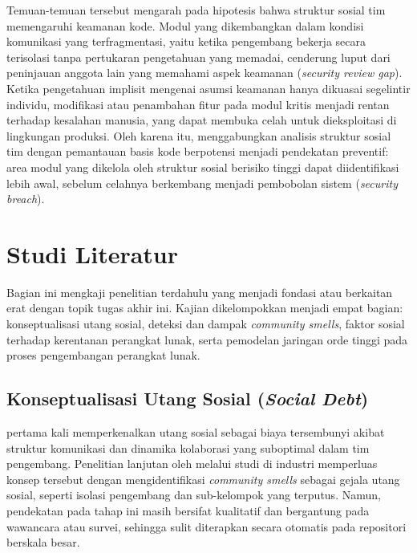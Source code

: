 Temuan-temuan tersebut mengarah pada hipotesis bahwa struktur sosial tim memengaruhi keamanan kode.
Modul yang dikembangkan dalam kondisi komunikasi yang terfragmentasi, yaitu ketika pengembang bekerja secara terisolasi tanpa pertukaran pengetahuan yang memadai, cenderung luput dari peninjauan anggota lain yang memahami aspek keamanan (\textit{security review gap}).
Ketika pengetahuan implisit mengenai asumsi keamanan hanya dikuasai segelintir individu, modifikasi atau penambahan fitur pada modul kritis menjadi rentan terhadap kesalahan manusia, yang dapat membuka celah untuk dieksploitasi di lingkungan produksi.
Oleh karena itu, menggabungkan analisis struktur sosial tim dengan pemantauan basis kode berpotensi menjadi pendekatan preventif: area modul yang dikelola oleh struktur sosial berisiko tinggi dapat diidentifikasi lebih awal, sebelum celahnya berkembang menjadi pembobolan sistem (\textit{security breach}).

\section{Studi Literatur}
Bagian ini mengkaji penelitian terdahulu yang menjadi fondasi atau berkaitan erat dengan topik tugas akhir ini.
Kajian dikelompokkan menjadi empat bagian: konseptualisasi utang sosial, deteksi dan dampak \textit{community smells}, faktor sosial terhadap kerentanan perangkat lunak, serta pemodelan jaringan orde tinggi pada proses pengembangan perangkat lunak.

\subsection{Konseptualisasi Utang Sosial (\textit{Social Debt})}
\textcite{tamburri2013social} pertama kali memperkenalkan utang sosial sebagai biaya tersembunyi akibat struktur komunikasi dan dinamika kolaborasi yang suboptimal dalam tim pengembang.
Penelitian lanjutan oleh \textcite{tamburri2015} melalui studi di industri memperluas konsep tersebut dengan mengidentifikasi \textit{community smells} sebagai gejala utang sosial, seperti isolasi pengembang dan sub-kelompok yang terputus.
Namun, pendekatan pada tahap ini masih bersifat kualitatif dan bergantung pada wawancara atau survei, sehingga sulit diterapkan secara otomatis pada repositori berskala besar.

